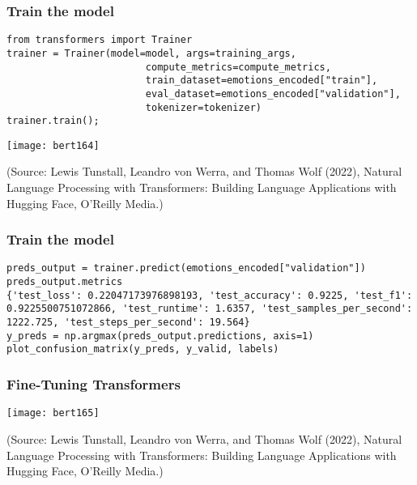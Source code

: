 \begin{frame}[fragile]\frametitle{Train the model}

\begin{lstlisting}
from transformers import Trainer
trainer = Trainer(model=model, args=training_args, 
						compute_metrics=compute_metrics,
						train_dataset=emotions_encoded["train"],
						eval_dataset=emotions_encoded["validation"],
						tokenizer=tokenizer)
trainer.train();
\end{lstlisting}
			
			\begin{center}
			\texttt{[image: bert164]}
			\end{center}	
			
			{\tiny (Source: Lewis Tunstall, Leandro von Werra, and Thomas Wolf (2022), Natural Language Processing with Transformers:  Building Language Applications with Hugging Face,  O'Reilly Media.)}
\end{frame}


\begin{frame}[fragile]\frametitle{Train the model}

\begin{lstlisting}
preds_output = trainer.predict(emotions_encoded["validation"])
preds_output.metrics
{'test_loss': 0.22047173976898193, 'test_accuracy': 0.9225, 'test_f1': 0.9225500751072866, 'test_runtime': 1.6357, 'test_samples_per_second': 1222.725, 'test_steps_per_second': 19.564}
y_preds = np.argmax(preds_output.predictions, axis=1)
plot_confusion_matrix(y_preds, y_valid, labels)
\end{lstlisting}
			

			
\end{frame}

\begin{frame}[fragile]\frametitle{Fine-Tuning Transformers}

		
			\begin{center}
			\texttt{[image: bert165]}
			\end{center}	
			
			{\tiny (Source: Lewis Tunstall, Leandro von Werra, and Thomas Wolf (2022), Natural Language Processing with Transformers:  Building Language Applications with Hugging Face,  O'Reilly Media.)}
\end{frame}

